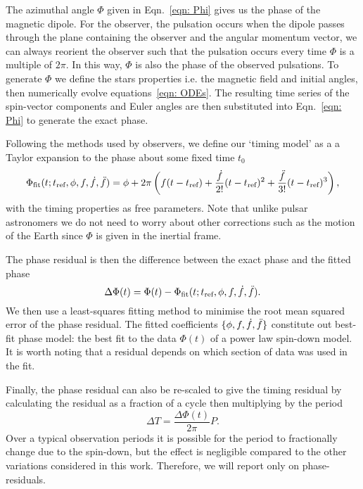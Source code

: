 \documentclass[../full_thesis/full_thesis.tex]{subfiles}
\begin{document}
The azimuthal angle $\Phi$ given in Eqn.~\eqref{eqn: Phi} gives us the phase of
the magnetic dipole. For the observer, the pulsation occurs when the dipole
passes through the plane containing the observer and the angular momentum
vector,  we can always reorient the observer such that the pulsation occurs
every time $\Phi$ is a multiple of $2\pi$. In this way, $\Phi$ is also the
phase of the observed pulsations. To generate $\Phi$ we define the stars
properties i.e. the magnetic field and initial angles, then numerically
evolve equations~\eqref{eqn: ODEs}. The resulting time series of the spin-vector
components and Euler angles are then substituted into Eqn.~\eqref{eqn: Phi} to
generate the exact phase.

Following the methods used by observers, we define our `timing model' as a
a Taylor expansion to the phase about some fixed time $t_{0}$
\begin{equation}
    \Phi_{\mathrm{fit}}(t; t_{\textrm{ref}}, \phi, f, \dot{f}, \ddot{f}) =
    \phi + 2\pi \left(f(t - t_{\textrm{ref}}) +
                          \frac{\dot{f}}{2!}(t-t_{\textrm{ref}})^{2} +
                          \frac{\ddot{f}}{3!}(t-t_{\textrm{ref}})^{3}
                          \right),
\label{eqn: TR taylor expansion}
\end{equation}
with the timing properties as free parameters.  Note that unlike pulsar
astronomers we do not need to worry about other corrections such as the motion
of the Earth since $\Phi$ is given in the inertial frame.

The phase residual is then the difference between the exact phase
and the fitted phase
\begin{equation}
  \Delta\Phi(t) = \Phi(t) - \Phi_{\mathrm{fit}}(t; t_{\textrm{ref}}, \phi, f, \dot{f}, \ddot{f}).
\end{equation}
We then use a least-squares fitting method to minimise the root mean squared
error of the phase residual. The fitted coefficients $\{\phi, f, \dot{f},
\ddot{f}\}$ constitute out best-fit phase model: the best fit to the data
$\Phi(t)$ of a power law spin-down model.  It is worth noting that a residual
depends on which section of data was used in the fit.

Finally, the phase residual can also be re-scaled to give the timing residual by
calculating the residual as a fraction of a cycle then multiplying by the
period
\begin{equation}
    \Delta T = \frac{\Delta\Phi(t)}{2\pi} P.
    \label{eqn: phase to timing}
\end{equation}
Over a typical observation periods it is possible for the period to
fractionally change due to the spin-down, but the effect is negligible compared
to the other variations considered in this work. Therefore, we will report only
on phase-residuals.
\end{document}

